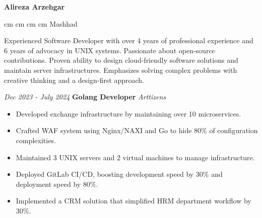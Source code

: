 \documentclass{engineercv}
\begin{document}
\begin{center}
  \textbf{\fontsize{24 pt}{24 pt}\selectfont Alireza Arzehgar}

  \vspace{0.2 cm}

  \scriptsize
  \mbox{}
   cm
  \mbox{}
   cm
  \mbox{}
   cm
  \mbox{}
   cm
  \mbox{{\color{black}\footnotesize\faMapMarker*}\hspace*{0.13cm}Mashhad}
\end{center}


Experienced Software Developer with over 4 years of professional experience and 6 years of advocacy in UNIX systems.
Passionate about open-source contributions. Proven ability to design cloud-friendly software solutions and
maintain server infrastructures. Emphasizes solving complex problems with creative thinking
and a design-first approach.


\begin{twocolentry}{\textit{Dec 2023 - July 2024}}
  \textbf{Golang Developer}
  \textit{Arttizens}
\end{twocolentry}

\begin{itemize}
  \item Developed exchange infrastructure by maintaining over 10 microservices.
  \item Crafted WAF system using Nginx/NAXI and Go to hide 80\% of configuration complexities.
  \item Maintained 3 UNIX servers and 2 virtual machines to manage infrastructure.
  \item Deployed GitLab CI/CD, boosting development speed by 30\% and deployment speed by 80\%.
  \item Implemented a CRM solution that simplified HRM department workflow by 30\%.
\end{itemize}
\end{document}
